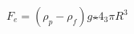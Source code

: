 \documentclass[preview]{standalone}
\begin{document}
\begin{center}
$F_e = (\rho_p - \rho_f)g\frac_^4_3 \pi R^3$
\end{center}
\end{document}
